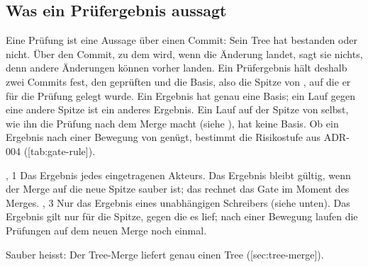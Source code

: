\subsection{Was ein Prüfergebnis aussagt}

Eine Prüfung ist eine Aussage über einen Commit: Sein Tree hat bestanden oder nicht.
Über den Commit, zu dem  wird, wenn die Änderung landet, sagt sie nichts, denn andere
Änderungen können vorher landen.
Ein Prüfergebnis hält deshalb zwei Commits fest, den geprüften und die Basis, also die Spitze von
, auf die er für die Prüfung gelegt wurde.
Ein Ergebnis hat genau eine Basis; ein Lauf gegen eine andere Spitze ist ein anderes Ergebnis.
Ein Lauf auf der Spitze von  selbst, wie ihn die Prüfung nach dem Merge macht
(siehe ), hat keine Basis.
Ob ein Ergebnis nach einer Bewegung von  genügt, bestimmt die Risikostufe aus ADR-004
([tab:gate-rule]).

\startplacetable[title={Welches Prüfergebnis zählt, und wie lange es nach einer Bewegung von main
gültig bleibt},
reference=tab:gate-rule]
\startxtable[frame=off,option=stretch]
\startxrow[topframe=on,bottomframe=on]
 \stopxcell
{} \stopxcell
{} \stopxcell
\stopxrow
\startxrow
{}, 1 \stopxcell
\startxcell Das Ergebnis jedes eingetragenen Akteurs. \stopxcell
\startxcell Das Ergebnis bleibt gültig, wenn der Merge auf die neue Spitze sauber ist; das
rechnet das Gate im Moment des Merges. \stopxcell
\stopxrow
\startxrow[bottomframe=on]
, 3 \stopxcell
\startxcell Nur das Ergebnis eines unabhängigen Schreibers (siehe unten). \stopxcell
\startxcell Das Ergebnis gilt nur für die Spitze, gegen die es lief; nach einer Bewegung laufen
die Prüfungen auf dem neuen Merge noch einmal. \stopxcell
\stopxrow
\stopxtable
\stopplacetable

Sauber heisst: Der Tree-Merge liefert genau einen Tree ([sec:tree-merge]).


